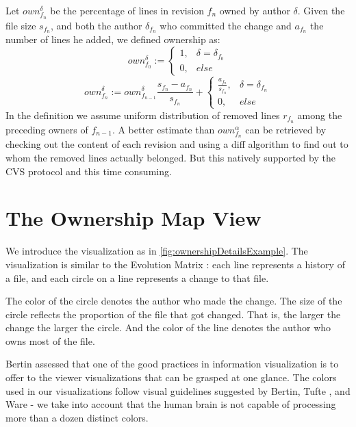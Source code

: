 Let $own_{f_n}^\delta$ be the percentage of lines in revision $f_n$ owned by author $\delta$. Given the file size $s_{f_n}$, and both the author $\delta_{f_n}$ who committed the change and $a_{f_n}$ the number of lines he added, we defined ownership as:
\[
own_{f_0}^ \delta:=\left\{
    \begin{array}{cl}
        1, & \delta= \delta_{f_0} \\
        0, & else
    \end{array}\right.
\]
\[
own_{f_n}^ \delta:=own_{f_{n-1}}^ \delta \frac{s_{f_n} - a_{f_n}}{s_{f_n}} + \left\{
    \begin{array}{cl}
        \frac{a_{f_n}}{s_{f_n}}, & \delta= \delta_{f_n} \\
        0, & else
    \end{array}\right.
\]
In the definition we assume uniform distribution of removed lines $r_{f_n}$ among the preceding owners of $f_{n-1}$. A better estimate than $own_{f_n}^\alpha$ can be retrieved by checking out the content of each revision and using a diff algorithm to find out to whom the removed lines actually belonged. But this natively supported by the CVS protocol and this time consuming.

\section{The Ownership Map View}\label{sec:approach}

We introduce the \omap visualization as in \autoref{fig:ownershipDetailsExample}. The visualization is similar to the Evolution Matrix \cite{Lanz02a}: each line represents a history of a file, and each circle on a line represents a change to that file.

The color of the circle denotes the author who made the change. The size of the circle reflects the proportion of the file that got changed. That is, the larger the change the larger the circle. And the color of the line denotes the author who owns most of the file.

Bertin \cite{Bert74a} assessed that one of the good practices in information visualization is to offer to the viewer visualizations that can be grasped at one glance. The colors used in our visualizations follow visual guidelines suggested by Bertin, Tufte \cite{Tuft90a}, and Ware \cite{Ware00a} \-- \eg we take into account that the human brain is not capable of processing more than a dozen distinct colors.

